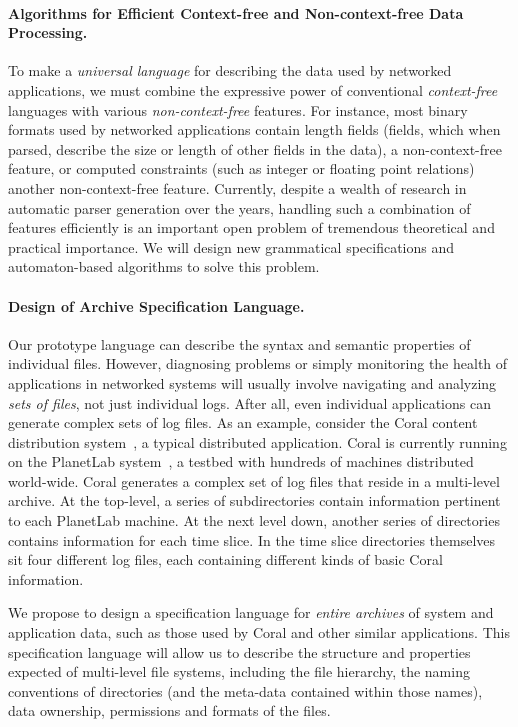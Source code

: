 \paragraph*{Algorithms for Efficient Context-free and Non-context-free Data Processing.}
To make \pads{} a {\em universal language} for describing the data used by
networked applications, we must combine the expressive power of conventional 
{\em context-free} languages with various {\em non-context-free} features.  
For instance, most binary formats used by networked applications
contain length fields (fields, which when parsed,
describe the size or length of other fields in the data), a non-context-free feature,
or computed constraints (such as integer or floating point relations) another non-context-free
feature.  Currently, despite a wealth of research in automatic parser generation over the years,
handling such a combination of features efficiently is an important open problem of tremendous
theoretical and practical importance.  We will design new grammatical specifications
and automaton-based algorithms to solve this problem.

\paragraph*{Design of Archive Specification Language.}  
Our prototype \pads{} language can describe the syntax and semantic properties
of individual files.  However, diagnosing problems or simply monitoring
the health of applications in networked systems
will usually involve navigating and analyzing {\em sets of files},
not just individual logs.  After all, even individual
applications can generate complex sets of log files. 
As an example, consider the Coral content
distribution system~\cite{coral}, a typical distributed application.
Coral is currently running on the PlanetLab system~\cite{planetlab}, a
testbed with hundreds of machines distributed world-wide.
Coral generates a complex set of log files that
reside in a multi-level archive.  At the top-level, a series of subdirectories
contain information pertinent to each PlanetLab machine.  At the next level down,
another series of directories contains information for each time slice.  In the
time slice directories themselves sit four different log files, each containing different 
kinds of basic Coral information.

We propose to design a specification language for {\em entire archives} of 
system and application data, such as those used by Coral and other similar
applications.  This specification language will allow us to describe the structure and
properties expected of multi-level file systems, including the file hierarchy, the
naming conventions of directories (and the meta-data contained within those names), data 
ownership, permissions and formats of the files.

